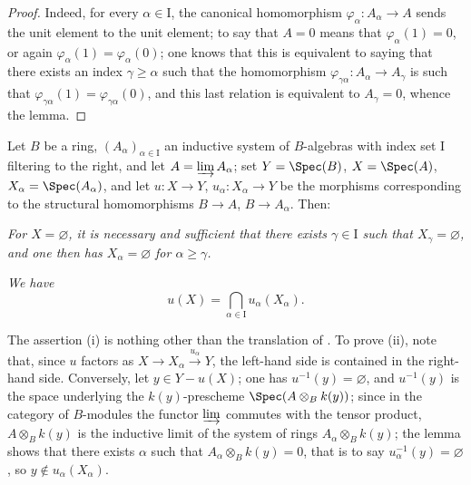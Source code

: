 \begin{proof}
Indeed, for every $\alpha\in\mathrm{I}$, the canonical homomorphism $\varphi_\alpha:A_\alpha\to A$ sends the unit element to the unit element; to say that $A=0$ means that $\varphi_\alpha(1)=0$, or again $\varphi_\alpha(1)=\varphi_\alpha(0)$; one knows that this is equivalent to saying that there exists an index $\gamma\geq\alpha$ such that the homomorphism $\varphi_{\gamma\alpha}:A_\alpha\to A_\gamma$ is such that $\varphi_{\gamma\alpha}(1)=\varphi_{\gamma\alpha}(0)$, and this last relation is equivalent to $A_\gamma=0$, whence the lemma.
\end{proof}

\begin{proposition}[1.9.2]
\label{IV.1.9.2}
Let $B$ be a ring, $(A_\alpha)_{\alpha\in\mathrm{I}}$ an inductive system of $B$-algebras with index set $\mathrm{I}$ filtering to the right, and let $A=\varinjlim A_\alpha$; set $Y=\Spec(B)$, $X=\Spec(A)$, $X_\alpha=\Spec(A_\alpha)$, and let $u:X\to Y$, $u_\alpha:X_\alpha\to Y$ be the morphisms corresponding to the structural homomorphisms $B\to A$, $B\to A_\alpha$.
Then:
\end{proposition}

\begin{env}[1.9.2.i]
\label{IV.1.9.2.i}
\emph{For $X=\varnothing$, it is necessary and sufficient that there exists $\gamma\in\mathrm{I}$ such that $X_\gamma=\varnothing$, and one then has $X_\alpha=\varnothing$ for $\alpha\geq\gamma$.}
\end{env}

\begin{env}[1.9.2.ii]
\label{IV.1.9.2.ii}
\emph{We have}
\[
  u(X)=\bigcap_{\alpha\in\mathrm{I}} u_\alpha(X_\alpha). \tag{1.9.2.1}
\label{IV.1.9.2.1}
\]
\end{env}

The assertion (i) is nothing other than the translation of .
To prove (ii), note that, since $u$ factors as $X\longrightarrow X_\alpha\xrightarrow{u_\alpha}Y$, the left-hand side is contained in the right-hand side.
Conversely, let $y\in Y-u(X)$; one has $u^{-1}(y)=\varnothing$, and $u^{-1}(y)$ is the space underlying the $k(y)$-prescheme $\Spec(A\otimes_B k(y))$; since in the category of $B$-modules the functor $\varinjlim$ commutes with the tensor product, $A\otimes_B k(y)$ is the inductive limit of the system of rings $A_\alpha\otimes_B k(y)$; the lemma  shows that there exists $\alpha$ such that $A_\alpha\otimes_B k(y)=0$, that is to say $u_\alpha^{-1}(y)=\varnothing$, so $y\notin u_\alpha(X_\alpha)$.

